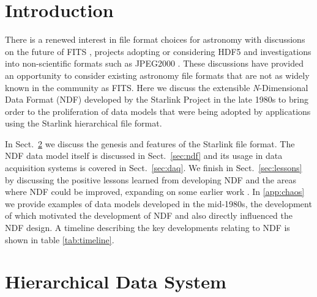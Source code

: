 \documentclass[final,authoryear,5p,times,twocolumn]{elsarticle}
\newcommand*\secref[1]{Sect.~\ref{#1}}
\begin{document}
\section{Introduction}
\label{sec:intro}

There is a renewed interest in file format choices for astronomy
with discussions on the future of FITS
\citep{P90_adassxxiii,2014Thomas}, projects adopting or considering
HDF5 \citep{2012ASPC..461..283A,jenness_spie2014} and investigations into
non-scientific formats such as JPEG2000 \citep{2014Kitaeff}. These
discussions have provided an opportunity to consider existing
astronomy file formats that are not as widely known in the community
as FITS. Here we discuss the extensible \emph{N}-Dimensional
Data Format (NDF) developed by the Starlink Project
\citep{1982MmSAI..53...55T,2000ASSL..250...93W} in the late 1980s
\citep{1988STARB...2...11C,SGP38} to bring order to the proliferation
of data models that were being adopted by applications using the Starlink
hierarchical file format.

In \secref{sec:hds} we discuss the genesis and features of the Starlink
file format. The NDF data model itself is
discussed in \secref{sec:ndf} and its usage in data acquisition
systems is covered in \secref{sec:daq}. We finish in
\secref{sec:lessons} by discussing the positive lessons learned from
developing NDF and the areas where NDF could be improved, expanding on
some earlier work \citep{P91_adassxxiii}. In \ref{app:chaos} we
provide examples of data models developed in the mid-1980s,
the development of which motivated the development of NDF
and also directly influenced the NDF design. A timeline describing the
key developments relating to NDF is shown in table \ref{tab:timeline}.

\section{Hierarchical Data System}
\label{sec:hds}
\end{document}
